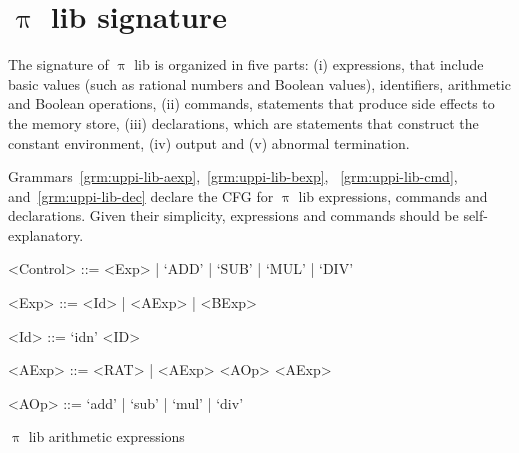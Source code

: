 \documentclass[a4paper,openany]{book}
\begin{document}
\section{$\uppi$ lib signature}\label{sec:uppi-lib-sig}

%
The signature of $\uppi$ lib is organized in five parts: (i) expressions, that include basic values (such as rational numbers and Boolean values), identifiers, arithmetic and Boolean operations, (ii) commands, statements that produce side effects to the memory store, (iii) declarations, which are statements that construct the constant environment, (iv) output and (v) abnormal termination.  

Grammars~\ref{grm:uppi-lib-aexp},~\ref{grm:uppi-lib-bexp}, ~\ref{grm:uppi-lib-cmd}, and~\ref{grm:uppi-lib-dec} declare the CFG for $\uppi$ lib expressions, commands and declarations. Given their simplicity, expressions and commands should be self-explanatory. 
%
%
\begin{Grammar}
\begin{grammar}
<Control> ::= <Exp> | `ADD' | `SUB' | `MUL' | `DIV'  

<Exp> ::= <Id> | <AExp> | <BExp> 

<Id> ::= `idn' <ID> 

<AExp> ::= <RAT> | <AExp> <AOp> <AExp> 

<AOp> ::= `add' | `sub' | `mul' | `div' 
\end{grammar}
\caption{$\uppi$ lib arithmetic expressions}
\label{grm:uppi-lib-aexp}
\end{Grammar}
\end{document}
